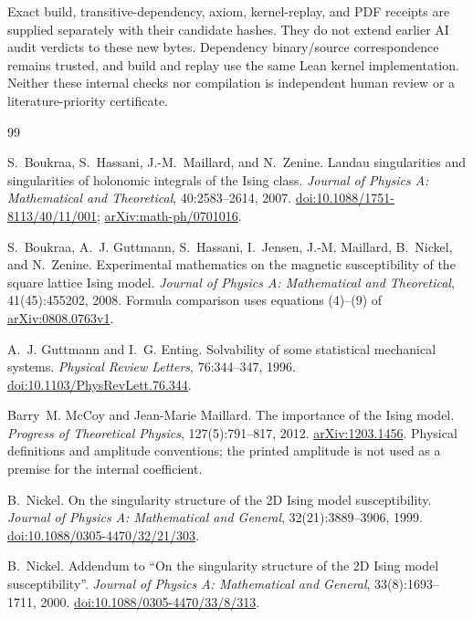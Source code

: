 \documentclass[11pt]{article}
\numberwithin{equation}{section}
\theoremstyle{definition}
\begin{document}
Exact build, transitive-dependency, axiom, kernel-replay, and PDF receipts
are supplied separately with their candidate hashes. They do not extend
earlier AI audit verdicts to these new bytes. Dependency binary/source
correspondence remains trusted, and build and replay use the same Lean
kernel implementation. Neither these internal checks nor compilation is
independent human review or a literature-priority certificate.

\begin{thebibliography}{99}

S.~Boukraa, S.~Hassani, J.-M.~Maillard, and N.~Zenine.
\newblock Landau singularities and singularities of holonomic integrals
of the Ising class.
\newblock \emph{Journal of Physics A: Mathematical and Theoretical},
40:2583--2614, 2007.
\newblock \href{https://doi.org/10.1088/1751-8113/40/11/001}{doi:10.1088/1751-8113/40/11/001};
\href{https://arxiv.org/abs/math-ph/0701016}{arXiv:math-ph/0701016}.

S.~Boukraa, A.~J. Guttmann, S.~Hassani, I.~Jensen, J.-M. Maillard,
B.~Nickel, and N.~Zenine.
\newblock Experimental mathematics on the magnetic susceptibility of the
square lattice {Ising} model.
\newblock \emph{Journal of Physics A: Mathematical and Theoretical},
41(45):455202, 2008.
\newblock Formula comparison uses equations (4)--(9) of
\href{https://arxiv.org/abs/0808.0763v1}{arXiv:0808.0763v1}.

A.~J. Guttmann and I.~G. Enting.
\newblock Solvability of some statistical mechanical systems.
\newblock \emph{Physical Review Letters}, 76:344--347, 1996.
\newblock \href{https://doi.org/10.1103/PhysRevLett.76.344}{doi:10.1103/PhysRevLett.76.344}.

Barry~M. McCoy and Jean-Marie Maillard.
\newblock The importance of the {Ising} model.
\newblock \emph{Progress of Theoretical Physics}, 127(5):791--817, 2012.
\newblock \href{https://arxiv.org/abs/1203.1456}{arXiv:1203.1456}.
Physical definitions and amplitude conventions; the printed amplitude
is not used as a premise for the internal coefficient.

B.~Nickel.
\newblock On the singularity structure of the 2D {Ising} model susceptibility.
\newblock \emph{Journal of Physics A: Mathematical and General},
32(21):3889--3906, 1999.
\newblock \href{https://doi.org/10.1088/0305-4470/32/21/303}{doi:10.1088/0305-4470/32/21/303}.

B.~Nickel.
\newblock Addendum to ``On the singularity structure of the 2D {Ising}
model susceptibility''.
\newblock \emph{Journal of Physics A: Mathematical and General},
33(8):1693--1711, 2000.
\newblock \href{https://doi.org/10.1088/0305-4470/33/8/313}{doi:10.1088/0305-4470/33/8/313}.


\end{thebibliography}
\end{document}
